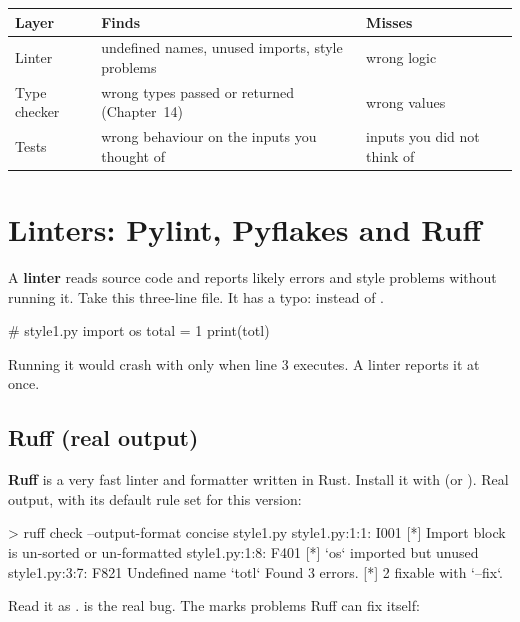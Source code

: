 \begin{center}
\begin{tabularx}{\linewidth}{@{}l >{\raggedright\arraybackslash}X >{\raggedright\arraybackslash}X@{}}
\toprule
\textbf{Layer} & \textbf{Finds} & \textbf{Misses} \\
\midrule
Linter & undefined names, unused imports, style problems & wrong logic \\
Type checker & wrong types passed or returned (Chapter~14) & wrong values \\
Tests & wrong behaviour on the inputs you thought of & inputs you did not think of \\
\bottomrule
\end{tabularx}
\end{center}

\section{Linters: Pylint, Pyflakes and Ruff}

A \textbf{linter} reads source code and reports likely errors and style problems without running it.
Take this three-line file. It has a typo:  instead of .

\begin{pycode}
# style1.py
import os
total = 1
print(totl)
\end{pycode}

Running it would crash with  only when line 3 executes. A linter reports it at once.

\subsection{Ruff (real output)}

\textbf{Ruff} is a very fast linter and formatter written in Rust. Install it with 
(or ). Real output, with its default rule set for this version:

\begin{rawcode}
> ruff check --output-format concise style1.py
style1.py:1:1: I001 [*] Import block is un-sorted or un-formatted
style1.py:1:8: F401 [*] `os` imported but unused
style1.py:3:7: F821 Undefined name `totl`
Found 3 errors.
[*] 2 fixable with `--fix`.
\end{rawcode}

Read it as .  is the real bug. The \code{[*]} marks problems Ruff can fix
itself:

